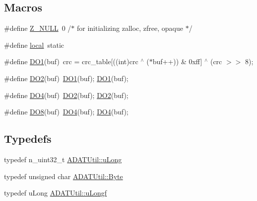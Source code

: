 \subsection*{Macros}
\begin{DoxyCompactItemize}
\item 
\#define \mbox{\hyperlink{adat-devel_2lib_2io_2adat__crc32_8cc_ad15afa2776b41b2f4d8582dd152bd736}{Z\+\_\+\+N\+U\+LL}}~0  /$\ast$ for initializing zalloc, zfree, opaque $\ast$/
\item 
\#define \mbox{\hyperlink{adat-devel_2lib_2io_2adat__crc32_8cc_a08023ea6765c99d60a6a3840cd07156e}{local}}~static
\item 
\#define \mbox{\hyperlink{adat-devel_2lib_2io_2adat__crc32_8cc_a6d5587d9c0724d87e000dec844eb48aa}{D\+O1}}(buf)~crc = crc\+\_\+table\mbox{[}((int)crc $^\wedge$ ($\ast$buf++)) \& 0xff\mbox{]} $^\wedge$ (crc $>$$>$ 8);
\item 
\#define \mbox{\hyperlink{adat-devel_2lib_2io_2adat__crc32_8cc_a075b45261620b7f357f8dc54fd365f85}{D\+O2}}(buf)~\mbox{\hyperlink{adat__devel_2lib_2io_2adat__crc32_8cc_a6d5587d9c0724d87e000dec844eb48aa}{D\+O1}}(buf); \mbox{\hyperlink{adat__devel_2lib_2io_2adat__crc32_8cc_a6d5587d9c0724d87e000dec844eb48aa}{D\+O1}}(buf);
\item 
\#define \mbox{\hyperlink{adat-devel_2lib_2io_2adat__crc32_8cc_aa6d6c63201e33bb8a064ae16954d1862}{D\+O4}}(buf)~\mbox{\hyperlink{adat__devel_2lib_2io_2adat__crc32_8cc_a075b45261620b7f357f8dc54fd365f85}{D\+O2}}(buf); \mbox{\hyperlink{adat__devel_2lib_2io_2adat__crc32_8cc_a075b45261620b7f357f8dc54fd365f85}{D\+O2}}(buf);
\item 
\#define \mbox{\hyperlink{adat-devel_2lib_2io_2adat__crc32_8cc_a0a4c30f665eefffb860606b683278bfe}{D\+O8}}(buf)~\mbox{\hyperlink{adat__devel_2lib_2io_2adat__crc32_8cc_aa6d6c63201e33bb8a064ae16954d1862}{D\+O4}}(buf); \mbox{\hyperlink{adat__devel_2lib_2io_2adat__crc32_8cc_aa6d6c63201e33bb8a064ae16954d1862}{D\+O4}}(buf);
\end{DoxyCompactItemize}
\subsection*{Typedefs}
\begin{DoxyCompactItemize}
\item 
typedef n\+\_\+uint32\+\_\+t \mbox{\hyperlink{namespaceADATUtil_a51b60d81747dd992a62e9f1dea60fb13}{A\+D\+A\+T\+Util\+::u\+Long}}
\item 
typedef unsigned char \mbox{\hyperlink{namespaceADATUtil_a420451c5593252de7271d104b24079b5}{A\+D\+A\+T\+Util\+::\+Byte}}
\item 
typedef u\+Long \mbox{\hyperlink{namespaceADATUtil_adf7f8db2cc2f19fe6143cf8a2ad881f4}{A\+D\+A\+T\+Util\+::u\+Longf}}
\end{DoxyCompactItemize}
